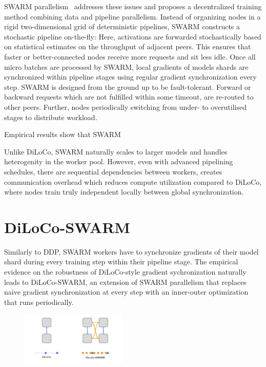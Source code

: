 \documentclass[conference, 10pt]{IEEEtran}
\begin{document}
SWARM parallelism~\cite{ryabinin2023} addresses these issues and proposes a
decentralized training method combining data and pipeline parallelism. Instead
of organizing nodes in a rigid two-dimensional grid of deterministic pipelines,
SWARM constructs a stochastic pipeline on-the-fly: Here, activations are
forwarded stochastically based on statistical estimates on the throughput of
adjacent peers. This ensures that faster or better-connected nodes receive more
requests and sit less idle. Once all micro batches are processed by SWARM, local
gradients of models shards are synchronized within pipeline stages using regular
gradient synchronization every step.  SWARM is designed from the ground up to be
fault-tolerant. Forward or backward requests which are not fulfilled within some
timeout, are re-routed to other peers. Further, nodes periodically switching
from under- to overutilised stages to distribute workload.


Empirical results show that SWARM 

Unlike DiLoCo, SWARM naturally scales to larger models and handles heterogenity
in the worker pool. However, even with advanced pipelining schedules, there are 
sequential dependencies between workers, creates communication overhead which 
reduces compute utilization compared to DiLoCo, where nodes train truly
independent locally between global synchronization.

\section{DiLoCo-SWARM}

Similarly to DDP, SWARM workers have to synchronize gradients of their model
shard during every training step within their pipeline stage. The empirical
evidence on the robustness of DiLoCo-style gradient sychronization naturally
leads to DiLoCo-SWARM, an extension of SWARM parallelism that replaces naive
gradient synchronization at every step with an inner-outer optimization that
runs periodically.

\begin{figure}[h]
    \centering
    \includegraphics[width=0.45\textwidth]{figures/diloco-swarm.png}
    \caption{}
    \label{fig:diloco-swarm}
\end{figure}
\end{document}
